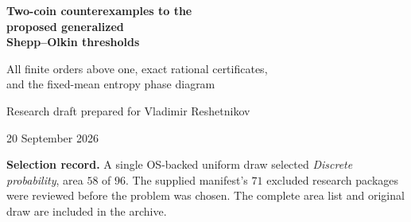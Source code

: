 \documentclass[11pt]{article}
\numberwithin{equation}{section}
\theoremstyle{definition}
\theoremstyle{remark}
\begin{document}
\begin{titlepage}
\thispagestyle{empty}
\vspace*{1.0cm}
\begin{center}
{\LARGE\bfseries\color{Ink} Two-coin counterexamples to the\\[.25em]
proposed generalized\\[.25em] Shepp--Olkin thresholds\par}
\vspace{.7cm}
{\large All finite orders above one, exact rational certificates,\\
and the fixed-mean entropy phase diagram\par}
\vspace{.8cm}
{\normalsize Research draft prepared for Vladimir Reshetnikov\par}
\vspace{.2cm}
{\normalsize 20 September 2026\par}
\end{center}
\vspace{.7cm}
\begin{abstract}
Hillion and Johnson proposed that the R\'enyi entropy of a sum of independent
Bernoulli variables is jointly concave in the Bernoulli parameters up to order
$2$, and that the corresponding Tsallis threshold is approximately $3.65986$.
We give a counterexample to both proposed numerical thresholds. In fact, for
every finite real $q>1$, both entropies fail even quasiconcavity for the sum of
\emph{two} independent Bernoulli variables, with all parameters strictly between
zero and one. The obstruction is a mean-preserving interpolation
$(p+t,p-t)$ near the all-zero corner. Its power sum has a negative second
variation at the balanced point when $p$ is sufficiently small.

The counterexamples admit a fully explicit dyadic family. At $q=2$, one
particularly small certificate has midpoint $(1/10,1/10)$ and endpoints
$(3/20,1/20)$ and $(1/20,3/20)$; the Tsallis midpoint deficit is exactly
$181/80000$. We also determine the sharp balanced-point curvature transition,
classify every fixed-mean two-coin entropy maximizer for $q>1$, prove concavity
on all two-coin fixed-mean segments for $0<q\leq1$, and identify the minimum
number of coins needed for failure. The transition near $q=1$ occurs on an
exponentially small parameter scale.

The all-order disproof is elementary and does not depend on numerical
experiments. Reproducible exact and symbolic checks accompany the article.
The general joint-concavity question for $0<q<1$ is not settled here, and
bibliographic priority and the proofs have not been independently refereed.
\end{abstract}
\vfill
\noindent\textbf{Selection record.} A single OS-backed uniform draw selected
\emph{Discrete probability}, area $58$ of $96$. The supplied manifest's
$71$ excluded research packages were reviewed before the problem was chosen.
The complete area list and original draw are included in the archive.
\end{titlepage}
\tableofcontents
\clearpage
\end{document}
